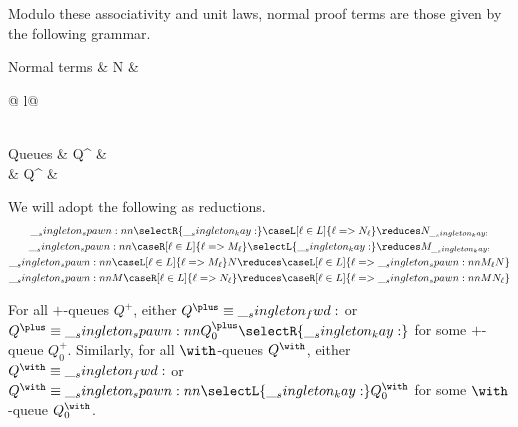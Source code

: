 Modulo these associativity and unit laws, normal proof terms are those given by the following grammar.
\begin{syntax*}
  Normal terms & N &
      \begin{array}[t]{@{{} \mid {}}l@{}}
         \\
      \end{array}
  \\
  Q{ueues} & Q^{\plus} &
    \fwd \mid {} \mid \selectR{\kay}
  \\
           & Q^{\with} &
    \fwd \mid {} \mid \selectL{\kay}
\end{syntax*}
We will adopt the following as reductions.
\begin{gather*}
  \spawn{\selectR{\kay}}{\caseL[\ell \in L]{\ell => N_{\ell}}}
    \reduces N_{\kay}
  \\
  \spawn{\caseR[\ell \in L]{\ell => M_{\ell}}}{\selectL{\kay}}
    \reduces M_{\kay}
  \\
  \spawn{\caseL[\ell \in L]{\ell => M_{\ell}}}{N}
    \reduces \caseL[\ell \in L]{\ell => \spawn{M_{\ell}}{N}}
  \\
  \spawn{M}{\caseR[\ell \in L]{\ell => N_{\ell}}}
    \reduces \caseR[\ell \in L]{\ell => \spawn{M}{N_{\ell}}}
\end{gather*}

\begin{lemma}
  For all $\plus$-queues $Q^{\plus}$, either $Q^{\plus} \equiv \fwd$ or $Q^{\plus} \equiv \spawn{Q^{\plus}_0}{\selectR{\kay}}$ for some $\plus$-queue $Q^{\plus}_0$.
  Similarly, for all $\with$-queues $Q^{\with}$, either $Q^{\with} \equiv \fwd$ or $Q^{\with} \equiv \spawn{\selectL{\kay}}{Q^{\with}_0}$ for some $\with$-queue $Q^{\with}_0$.
\end{lemma}

